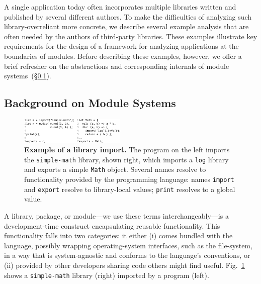 \documentclass[letterpaper,twocolumn,10pt]{article}
\def\ie{{\em i.e.}, }
\newcommand{\ttt}[1]{\texttt{#1}}
\newcommand{\sx}[1]{(\S\ref{#1})}
\begin{document}
A single application today often incorporates multiple libraries written and published by several different authors.
To make the difficulties of analyzing such library-overreliant more concrete, we describe several example analysis that are often needed by the authors of third-party libraries.
These examples illustrate key requirements for the design of a framework for analyzing applications at the boundaries of modules.
Before describing these examples, however, we offer a brief refresher on the abstractions and corresponding internals of module systems~\sx{bg1}.


\subsection{Background on Module Systems}
\label{bg1}

\begin{figure}[t]
\raggedleft 
\includegraphics[width=0.45\textwidth]{./figs/lya_ex1.pdf}
\caption{
  \textbf{Example of a library import.}
  \textmd{
    The program on the left imports the \ttt{simple-math} library, shown right, which imports a \ttt{log} library and exports a simple \ttt{Math} object.
    Several names resolve to functionality provided by the programming language:
      names \ttt{import} and \ttt{export} resolve to library-local values; \ttt{print} resolves to a global value.
  }
}
\label{fig:ex1}
\end{figure}


A library, package, or module---we use these terms interchangeably---is a development-time construct encapsulating reusable functionality.
This functionality falls into two categories:
  it either (i) comes bundled with the language, possibly wrapping operating-system interfaces, such as the file-system, in a way that is system-agnostic and conforms to the language's conventions,
  or (ii) provided by other developers sharing code others might find useful.
Fig.~\ref{fig:ex1} shows a \ttt{simple-math} library (right) imported by a program (left).
\end{document}
